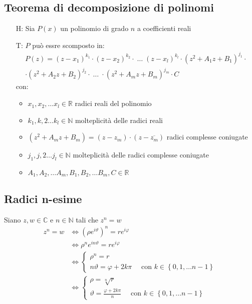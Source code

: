 \documentclass[a4paper]{article}
\begin{document}
\subsection{Teorema di decomposizione di polinomi}
\begin{itemize}
	\item[H:] Sia \(P(x)\) un polinomio di grado \(n\) a coefficienti reali
	\item[T:] \(P\) può essre scomposto in:
	\begin{multline*}
		P(z) = \left( z - x_1 \right) ^ {k_1} \cdot \left( z - x_2 \right) ^ {k_2} \cdot \; \dots \; \left( z - x_l \right) ^ {k_l} \cdot \left( z^2 + A_1 z + B_1 \right) ^ {j_1} \cdot \\
		\cdot \left( z^2 + A_2 z + B_2 \right) ^ {j_2} \cdot \; \dots \; \cdot \left( z^2 + A_m z + B_m \right) ^ {j_m} \cdot  C
	\end{multline*}
	con:
	\begin{itemize}
		\item \(x_1, x_2, \dots x_l \in \mathbb{R}\) radici reali del polinomio
		\item \(k_1, k,2 \dots k_l \in \mathbb{N}\) molteplicità delle radici reali
		\item \(\left( z^2 + A_m z + B_m \right) = \left( z - z_m \right) \cdot \left( z - \overline{z_m} \right)\) radici complesse coniugate
		\item \(j_1, j,2 \dots j_l \in \mathbb{N}\) molteplicità delle radici complesse coniugate
		\item \(A_1, A_2, \dots A_m, B_1, B_2, \dots B_m, C \in \mathbb{R}\)
	\end{itemize}
\end{itemize}

\subsection{Radici n-esime}
Siano \(z, w \in \mathbb{C}\) e \(n \in \mathbb{N}\) tali che \(z ^ n = w\)
\begin{align*}
	z ^ n = w &\Leftrightarrow \left( \rho e ^ {i \vartheta} \right) ^ n = r e ^ {i \varphi} \\
	&\Leftrightarrow \rho ^ n e ^ {i n \vartheta} = r e ^ {i \varphi} \\
	&\Leftrightarrow
	\begin{cases}
		\rho ^ n = r \\
		n \vartheta = \varphi + 2 k \pi \quad \text{ con } k \in \left\{ 0, 1, \dots n-1 \right\}
	\end{cases} \\
	&\Leftrightarrow
	\begin{cases}
		\rho = \sqrt[n]{r} \\
		\vartheta = \frac{\varphi + 2k\pi}{n} \quad \text{ con } k \in \left\{ 0, 1, \dots n-1 \right\}
	\end{cases}
\end{align*}
\end{document}
